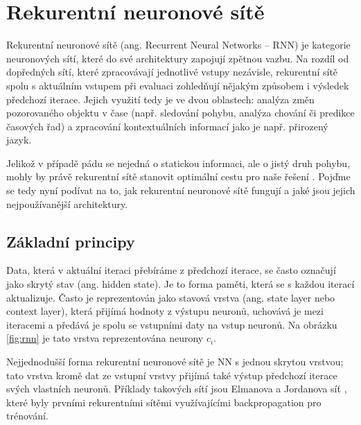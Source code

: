 \chapter{Rekurentní neuronové sítě}
\label{chap:RNN}

Rekurentní neuronové sítě (ang. Recurrent Neural Networks – RNN) je kategorie
neuronových sítí, které do své architektury zapojují zpětnou vazbu. Na rozdíl
od dopředných sítí, které zpracovávají jednotlivé vstupy nezávisle, rekurentní
sítě spolu s aktuálním vstupem při evaluaci zohledňují nějakým způsobem i
výsledek předchozí iterace. Jejich využití tedy je ve dvou oblastech: analýza
změn pozorovaného objektu v čase (např. sledování pohybu, analýza chování či
predikce časových řad) a zpracování kontextuálních informací jako je např.
přirozený jazyk.

Jelikož v případě pádu se nejedná o statickou informaci, ale o jistý druh
pohybu, mohly by právě rekurentní sítě stanovit optimální cestu pro naše řešení
\cite{dhruv2020image}. Pojďme se tedy nyní podívat na to, jak rekurentní
neuronové sítě fungují a jaké jsou jejich nejpoužívanější architektury.

\section{Základní principy}

Data, která v aktuální iteraci přebíráme z předchozí iterace, se často označují
jako skrytý stav (ang. hidden state). Je to forma paměti, která se s každou
iterací aktualizuje. Často je reprezentován jako stavová vrstva (ang. state
layer nebo context layer), která přijímá hodnoty z výstupu neuronů, uchovává je
mezi iteracemi a předává je spolu se vstupními daty na vstup neuronů. Na
obrázku \ref{fig:rnn} je tato vrstva reprezentována neurony $c_i$.

Nejjednodušší forma rekurentní neuronové sítě je NN s jednou skrytou vrstvou;
tato vrstva kromě dat ze vstupní vrstvy přijímá také výstup předchozí iterace
svých vlastních neuronů. Příklady takových sítí jsou Elmanova a Jordanova síť
\cite{elman} \cite{jordan}, které byly prvními rekurentními sítěmi
využívajícími backpropagation pro trénování.

